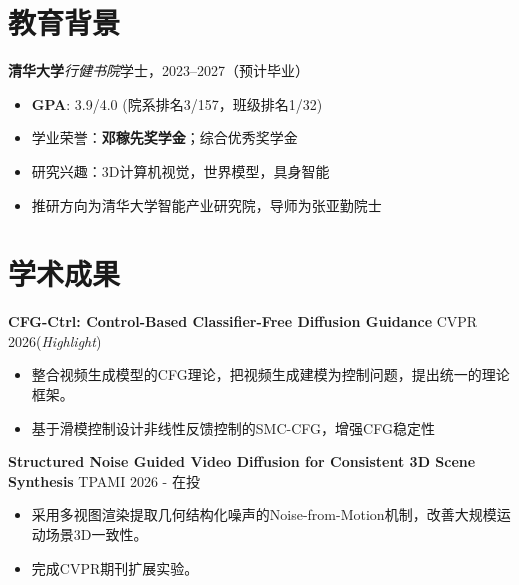 \documentclass{resume}
\begin{document}



\section{教育背景}
\textbf{清华大学}\quad \textit{行健书院}\hfill{学士，2023--2027（预计毕业）}
\begin{itemize}
    \item \textbf{GPA}: 3.9/4.0 \space (院系排名3/157，班级排名1/32)
    \item 学业荣誉：\textbf{邓稼先奖学金}；综合优秀奖学金
    \item 研究兴趣：3D计算机视觉，世界模型，具身智能
    \item 推研方向为清华大学智能产业研究院，导师为张亚勤院士
\end{itemize}

\vspace{1ex}

\section{学术成果}

\textbf{CFG-Ctrl: Control-Based Classifier-Free Diffusion Guidance} \hfill CVPR 2026(\textit{Highlight}) 
\vspace{1ex}
\;
\vspace{0.5ex}
\begin{itemize}
    \item 整合视频生成模型的CFG理论，把视频生成建模为控制问题，提出统一的理论框架。
    \item 基于滑模控制设计非线性反馈控制的SMC-CFG，增强CFG稳定性
\end{itemize}

\vspace{1ex}


\textbf{Structured Noise Guided Video Diffusion for Consistent 3D Scene Synthesis} \hfill TPAMI 2026 - 在投
\vspace{1ex}
\;
\vspace{0.5ex}
\begin{itemize}
    \item 采用多视图渲染提取几何结构化噪声的Noise-from-Motion机制，改善大规模运动场景3D一致性。
    \item 完成CVPR期刊扩展实验。
\end{itemize}
\end{document}
